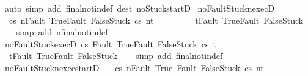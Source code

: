 \begin{isabellebody}
\endisadelimproof
%
\isatagproof
{}\isamarkupfalse%
\ {\isacharparenleft}auto\ simp\ add{\isacharcolon}\ final{\isacharunderscore}notin{\isacharunderscore}def\ dest{\isacharcolon}\ noStuck{\isacharunderscore}startD{\isacharparenright}%
\endisatagproof
{\isafoldproof}%
%
\isadelimproof
\isanewline
%
\endisadelimproof
\isanewline
{}\isamarkupfalse%
\ noFaultStuckn{\isacharunderscore}execD{\isacharcolon}\ \isanewline
\ \ {\isachardoublequoteopen}{\isasymlbrakk}{\isasymGamma}{\isasymturnstile}{\isasymlangle}c{\isacharcomma}s{\isasymrangle}\ {\isacharequal}n{\isasymRightarrow}{\isasymnotin}{\isacharbraceleft}Fault\ True{\isacharcomma}Fault\ False{\isacharcomma}Stuck{\isacharbraceright}{\isacharsemicolon}\ {\isasymGamma}{\isasymturnstile}{\isasymlangle}c{\isacharcomma}s{\isasymrangle}\ {\isacharequal}n{\isasymRightarrow}t{\isasymrbrakk}\ {\isasymLongrightarrow}\ \isanewline
\ \ \ \ \ \ \ t{\isasymnotin}{\isacharbraceleft}Fault\ True{\isacharcomma}Fault\ False{\isacharcomma}Stuck{\isacharbraceright}{\isachardoublequoteclose}\isanewline
%
\isadelimproof
\ \ %
\endisadelimproof
%
\isatagproof
{}\isamarkupfalse%
\ {\isacharparenleft}simp\ add{\isacharcolon}\ nfinal{\isacharunderscore}notin{\isacharunderscore}def{\isacharparenright}%
\endisatagproof
{\isafoldproof}%
%
\isadelimproof
\isanewline
%
\endisadelimproof
\isanewline
{}\isamarkupfalse%
\ noFaultStuck{\isacharunderscore}execD{\isacharcolon}\ {\isachardoublequoteopen}{\isasymlbrakk}{\isasymGamma}{\isasymturnstile}{\isasymlangle}c{\isacharcomma}s{\isasymrangle}\ {\isasymRightarrow}{\isasymnotin}{\isacharbraceleft}Fault\ True{\isacharcomma}Fault\ False{\isacharcomma}Stuck{\isacharbraceright}{\isacharsemicolon}\ {\isasymGamma}{\isasymturnstile}{\isasymlangle}c{\isacharcomma}s{\isasymrangle}\ {\isasymRightarrow}t{\isasymrbrakk}\ \isanewline
\ {\isasymLongrightarrow}\ t{\isasymnotin}{\isacharbraceleft}Fault\ True{\isacharcomma}Fault\ False{\isacharcomma}Stuck{\isacharbraceright}{\isachardoublequoteclose}\isanewline
%
\isadelimproof
\ \ %
\endisadelimproof
%
\isatagproof
{}\isamarkupfalse%
\ {\isacharparenleft}simp\ add{\isacharcolon}\ final{\isacharunderscore}notin{\isacharunderscore}def{\isacharparenright}%
\endisatagproof
{\isafoldproof}%
%
\isadelimproof
\isanewline
%
\endisadelimproof
\isanewline
{}\isamarkupfalse%
\ noFaultStuckn{\isacharunderscore}exec{\isacharunderscore}startD{\isacharcolon}\ \isanewline
\ \ {\isachardoublequoteopen}{\isasymlbrakk}{\isasymGamma}{\isasymturnstile}{\isasymlangle}c{\isacharcomma}s{\isasymrangle}\ {\isacharequal}n{\isasymRightarrow}{\isasymnotin}{\isacharbraceleft}Fault\ True{\isacharcomma}\ Fault\ False{\isacharcomma}Stuck{\isacharbraceright}{\isacharsemicolon}\ {\isasymGamma}{\isasymturnstile}{\isasymlangle}c{\isacharcomma}s{\isasymrangle}\ {\isacharequal}n{\isasymRightarrow}t{\isasymrbrakk}\ \isanewline

\end{isabellebody}
